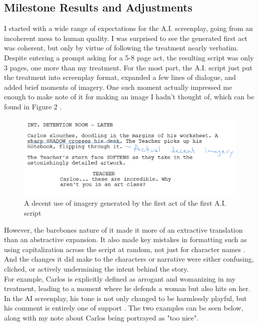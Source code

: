 \documentclass[sigconf]{acmart}
\begin{document}
\subsection{Milestone Results and Adjustments}
\indent I started with a wide range of expectations for the A.I. screenplay, going from an incoherent mess to human quality. I was surprised to see the generated first act was coherent, but only by virtue of following the treatment nearly verbatim. Despite entering a prompt asking for a 5-8 page act, the resulting script was only 3 pages, one more than my treatment. For the most part, the A.I. script just put the treatment into screenplay format, expanded a few lines of dialogue, and added brief moments of imagery. One such moment actually impressed me enough to make note of it for making an image I hadn't thought of, which can be found in Figure 2 \cite{chatgpt}.\\
\begin{figure}[!hbt]
    \centering
    \includegraphics[width=0.8\linewidth]{images/AIA1Imagery.png}
    \caption{A decent use of imagery generated by the first act of the first A.I. script}
    \label{fig:a1-imagery}
\end{figure}
\indent However, the barebones nature of it made it more of an extractive translation than an abstractive expansion. It also made key mistakes in formatting such as using capitalization across the script at random, not just for character names \cite{chatgpt}. And the changes it did make to the characters or narrative were either confusing, cliched, or actively undermining the intent behind the story.\\
\indent For example, Carlos is explicitly defined as arrogant and womanizing in my treatment, leading to a moment where he defends a woman but also hits on her. In the AI screenplay, his tone is not only changed to be harmlessly playful, but his comment is entirely one of support \cite{chatgpt}. The two examples can be seen below, along with my note about Carlos being portrayed as "too nice".\\
\end{document}
